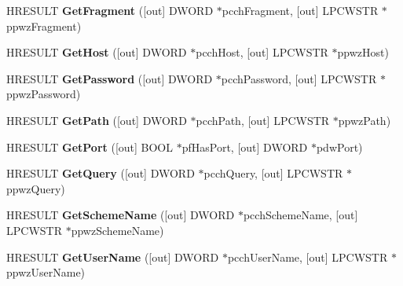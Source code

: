 \begin{DoxyCompactItemize}
H\+R\+E\+S\+U\+LT {\bfseries Get\+Fragment} (\mbox{[}out\mbox{]} D\+W\+O\+RD $\ast$pcch\+Fragment, \mbox{[}out\mbox{]} L\+P\+C\+W\+S\+TR $\ast$ppwz\+Fragment)
\item 
\mbox{\label{interface_i_uri_builder_abf7724dffd63f3763c9781a926a52998}} 
H\+R\+E\+S\+U\+LT {\bfseries Get\+Host} (\mbox{[}out\mbox{]} D\+W\+O\+RD $\ast$pcch\+Host, \mbox{[}out\mbox{]} L\+P\+C\+W\+S\+TR $\ast$ppwz\+Host)
\item 
\mbox{\label{interface_i_uri_builder_a4ecc5d2e9434a9895f4377549c655262}} 
H\+R\+E\+S\+U\+LT {\bfseries Get\+Password} (\mbox{[}out\mbox{]} D\+W\+O\+RD $\ast$pcch\+Password, \mbox{[}out\mbox{]} L\+P\+C\+W\+S\+TR $\ast$ppwz\+Password)
\item 
\mbox{\label{interface_i_uri_builder_a0d12f49320421625def2a9721b1d186e}} 
H\+R\+E\+S\+U\+LT {\bfseries Get\+Path} (\mbox{[}out\mbox{]} D\+W\+O\+RD $\ast$pcch\+Path, \mbox{[}out\mbox{]} L\+P\+C\+W\+S\+TR $\ast$ppwz\+Path)
\item 
\mbox{\label{interface_i_uri_builder_ac1794ae25149d9dd81c43c7bc0f58e1f}} 
H\+R\+E\+S\+U\+LT {\bfseries Get\+Port} (\mbox{[}out\mbox{]} B\+O\+OL $\ast$pf\+Has\+Port, \mbox{[}out\mbox{]} D\+W\+O\+RD $\ast$pdw\+Port)
\item 
\mbox{\label{interface_i_uri_builder_a7e394cdf217f0da4979135dc90b064fe}} 
H\+R\+E\+S\+U\+LT {\bfseries Get\+Query} (\mbox{[}out\mbox{]} D\+W\+O\+RD $\ast$pcch\+Query, \mbox{[}out\mbox{]} L\+P\+C\+W\+S\+TR $\ast$ppwz\+Query)
\item 
\mbox{\label{interface_i_uri_builder_ad5255bb37a345d2772227112994b756a}} 
H\+R\+E\+S\+U\+LT {\bfseries Get\+Scheme\+Name} (\mbox{[}out\mbox{]} D\+W\+O\+RD $\ast$pcch\+Scheme\+Name, \mbox{[}out\mbox{]} L\+P\+C\+W\+S\+TR $\ast$ppwz\+Scheme\+Name)
\item 
\mbox{\label{interface_i_uri_builder_a554ba2efeb688cc4bc59d764219e7f12}} 
H\+R\+E\+S\+U\+LT {\bfseries Get\+User\+Name} (\mbox{[}out\mbox{]} D\+W\+O\+RD $\ast$pcch\+User\+Name, \mbox{[}out\mbox{]} L\+P\+C\+W\+S\+TR $\ast$ppwz\+User\+Name)
\item 

\end{DoxyCompactItemize}
